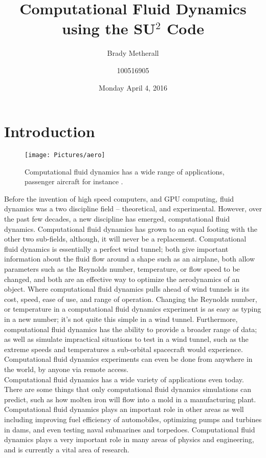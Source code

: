 \documentclass[10pt, titlepage]{article}
\title{Computational Fluid Dynamics \\ \large using the SU$^2$ Code}
\author{Brady Metherall \and 100516905}
\date{Monday April 4, 2016}
\begin{document}
\maketitle
\setlength\parindent{0pt}
\lstset{language=myMMA}

\listoffigures
\listoftables

\section{Introduction}

\begin{wrapfigure}{R}{0.45\textwidth}
\centering
\texttt{[image: Pictures/aero]}
\caption[Example of Computational Fluid Dynamics Applications]{Computational fluid dynamics has a wide range of applications, passenger aircraft for instance \cite{aeroplane}.}
\label{fig:aeroplane}
\end{wrapfigure}

Before the invention of high speed computers, and GPU computing, fluid dynamics was a two discipline field -- theoretical, and experimental. However, over the past few decades, a new discipline has emerged, computational fluid dynamics. Computational fluid dynamics has grown to an equal footing with the other two sub-fields, although, it will never be a replacement.  Computational fluid dynamics is essentially a perfect wind tunnel; both give important information about the fluid flow around a shape such as an airplane, both allow parameters such as the Reynolds number, temperature, or flow speed to be changed, and both are an effective way to optimize the aerodynamics of an object. Where computational fluid dynamics pulls ahead of wind tunnels is its cost, speed, ease of use, and range of operation. Changing the Reynolds number, or temperature in a computational fluid dynamics experiment is as easy as typing in a new number; it's not quite this simple in a wind tunnel. Furthermore, computational fluid dynamics has the ability to provide a broader range of data; as well as simulate impractical situations to test in a wind tunnel, such as the extreme speeds and temperatures a sub-orbital spacecraft would experience. Computational fluid dynamics experiments can even be done from anywhere in the world, by anyone via remote access. \\

Computational fluid dynamics has a wide variety of applications even today. There are some things that only computational fluid dynamics simulations can predict, such as how molten iron will flow into a mold in a manufacturing plant. Computational fluid dynamics plays an important role in other areas as well including improving fuel efficiency of automobiles, optimizing pumps and turbines in dams, and even testing naval submarines and torpedoes. Computational fluid dynamics plays a very important role in many areas of physics and engineering, and is currently a vital area of research. \\
\end{document}
